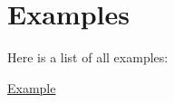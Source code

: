 \section{Examples}
Here is a list of all examples\+:\begin{DoxyCompactItemize}
\item 
\hyperlink{_example-example}{Example}
\end{DoxyCompactItemize}
